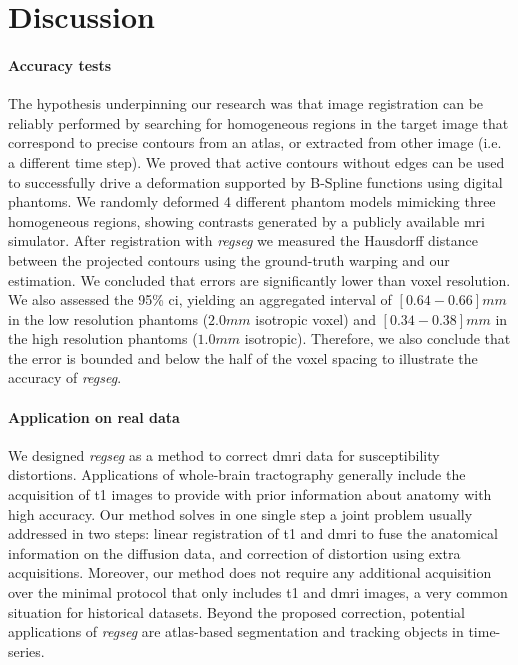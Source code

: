 \section{Discussion}
\label{sec:discussion}

\paragraph*{Accuracy tests}
The hypothesis underpinning our research was that image registration can be reliably performed
  by searching for homogeneous regions in the target image that correspond to precise contours
  from an atlas, or extracted from other image (i.e. a different time step).
We proved that active contours without edges can be used to successfully drive a
  deformation supported by B-Spline functions using digital phantoms.
We randomly deformed 4 different phantom models mimicking three homogeneous regions,
  showing contrasts generated by a publicly available \gls*{mri} simulator.
After registration with \emph{regseg} we measured the Hausdorff distance between the
  projected contours using the ground-truth warping and our estimation.
We concluded that errors are significantly lower than voxel resolution.
We also assessed the 95\% \gls*{ci}, yielding an aggregated interval of
  $[0.64 - 0.66]mm$ in the low resolution phantoms ($2.0mm$ isotropic voxel) and
  $[0.34 - 0.38]mm$ in the high resolution phantoms ($1.0mm$ isotropic).
Therefore, we also conclude that the error is bounded and below the half of the
  voxel spacing to illustrate the accuracy of \emph{regseg}.

\paragraph*{Application on real data}
We designed \emph{regseg} as a method to correct \gls*{dmri} data for susceptibility
  distortions.
Applications of whole-brain tractography generally include the acquisition of \gls*{t1} images
  to provide with prior information about anatomy with high accuracy.
Our method solves in one single step a joint problem usually addressed in two steps:
  linear registration of \gls*{t1} and \gls*{dmri} to fuse the anatomical information on
  the diffusion data, and correction of distortion using extra acquisitions.
Moreover, our method does not require any additional acquisition over the minimal protocol
  that only includes \gls*{t1} and \gls*{dmri} images, a very common situation for
  historical datasets.
Beyond the proposed correction, potential applications of \emph{regseg} are atlas-based
  segmentation and tracking objects in time-series.

